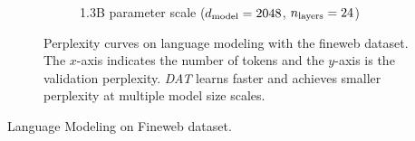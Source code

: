 \documentclass[letterpaper]{article}
\begin{document}
\begin{figure}[ht]
\begin{subfigure}{0.44\textwidth}
        \caption{1.3B parameter scale ($d_{\mathrm{model}} = 2048$, $n_{\mathrm{layers}} = 24$)}
    \end{subfigure}
    \caption{Perplexity curves on language modeling with the fineweb dataset. The $x$-axis indicates the number of tokens and the $y$-axis is the validation perplexity. \textit{DAT} learns faster and achieves smaller perplexity at multiple model size scales.}\label{fig:tiny_stories_val_loss_curves}
\end{figure}

\begin{table}[]
    \centering
    \caption{Language Modeling on Fineweb dataset.}\label{tab:my-table}
    
\end{table}
\end{document}

